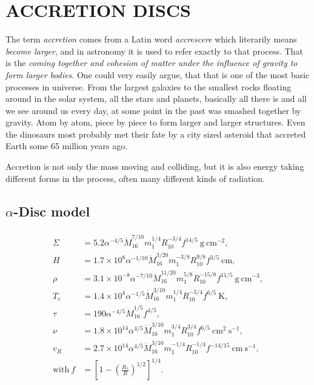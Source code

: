 \chapter{ACCRETION DISCS}

The term \emph{accretion} comes from a Latin word \emph{accrescere} which literarily means \emph{become larger}, and in astronomy it is used to refer exactly to that process. That is the \emph{coming together and cohesion of matter under the influence of gravity to form larger bodies}. One could very easily argue, that that is one of the most basic processes in universe. From the largest galaxies to the smallest rocks floating around in the solar system, all the stars and planets, basically all there is and all we see around us every day, at some point in the past was smashed together by gravity. Atom by atom, piece by piece to form larger and larger structures. Even the dinosaurs most probably met their fate by a city sized asteroid that accreted Earth some 65 million years ago. 

Accretion is not only the mass moving and colliding, but it is also energy taking different forms in the process, often many different kinds of radiation.

\section[$\alpha$-Disc model]{$\alpha$-Disc model}

\begin{align}
\begin{split}
\Sigma 	&= 5.2 \alpha^{-4/5} \dot{M}^{7/10}_{16} m^{1/4}_1 R^{-3/4}_{10} f^{14/5}\ \mathrm{g\ cm^{-2}}, \\
H		&= 1.7 \times 10^8 \alpha^{-1/10} \dot{M}^{3/20}_{16} m^{-3/8}_1 R^{9/8}_{10} f^{3/5}\ \mathrm{cm}, \\
\rho		&= 3.1 \times 10^{-8} \alpha^{-7/10} \dot{M}^{11/20}_{16} m^{5/8}_1 R^{-15/8}_{10} f^{11/5}\ \mathrm{g\ cm^{-3}}, \\
T_c		&= 1.4 \times 10^4 \alpha^{-1/5} \dot{M}^{3/10}_{16} m^{1/4}_1 R^{-3/4}_{10} f^{6/5}\ \mathrm{K}, \\
\tau		&= 190 \alpha^{-4/5} \dot{M}^{1/5}_{16} f^{4/5}, \\
\nu		&= 1.8 \times 10^{14} \alpha^{4/5} \dot{M}^{3/10}_{16} m^{3/4}_1 R^{3/4}_{10} f^{6/5}\ \mathrm{cm^2\ s^{-1}},  \\
v_R		&= 2.7 \times 10^{14} \alpha^{4/5} \dot{M}^{3/10}_{16} m^{-1/4}_1 R^{-1/4}_{10} f^{-14/15}\ \mathrm{cm\ s^{-1}},  \\
\mathrm{with}\ f		&= \left[ 1 - \left( \frac{R_*}{R} \right)^{1/2} \right]^{1/4}. \\
\end{split}
\label{eq:alpha_model}
\end{align}

